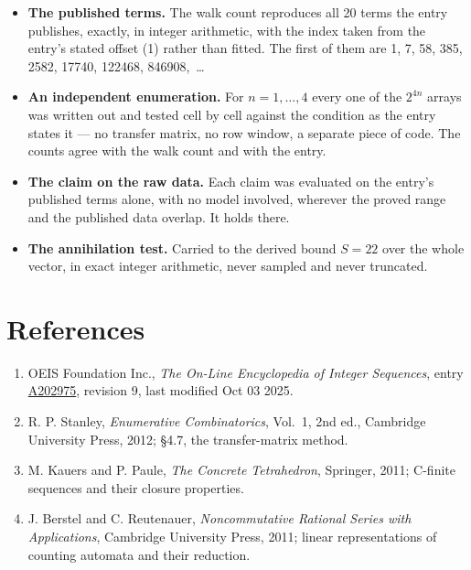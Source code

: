 \documentclass[11pt]{article}
\theoremstyle{definition}
\begin{document}
\begin{itemize}

\item {\bfseries The published terms.} The walk count reproduces all 20 terms the entry publishes, exactly, in integer arithmetic, with the index taken from the entry's stated offset (1) rather than fitted. The first of them are 1, 7, 58, 385, 2582, 17740, 122468, 846908,~\dots

\item {\bfseries An independent enumeration.} For $n = 1,\dots,4$ every one of the $2^{4n}$ arrays was written out and tested cell by cell against the condition as the entry states it --- no transfer matrix, no row window, a separate piece of code. The counts agree with the walk count and with the entry.

\item {\bfseries The claim on the raw data.} Each claim was evaluated on the entry's published terms alone, with no model involved, wherever the proved range and the published data overlap. It holds there.

\item {\bfseries The annihilation test.} Carried to the derived bound $S = 22$ over the whole vector, in exact integer arithmetic, never sampled and never truncated.

\end{itemize}

\section{References}

\begin{enumerate}

\item OEIS Foundation Inc., \emph{The On-Line Encyclopedia of Integer Sequences}, entry \href{https://oeis.org/A202975}{A202975}, revision 9, last modified Oct 03 2025.

\item R. P. Stanley, \emph{Enumerative Combinatorics}, Vol.~1, 2nd ed., Cambridge University Press, 2012; \S4.7, the transfer-matrix method.

\item M. Kauers and P. Paule, \emph{The Concrete Tetrahedron}, Springer, 2011; C-finite sequences and their closure properties.

\item J. Berstel and C. Reutenauer, \emph{Noncommutative Rational Series with Applications}, Cambridge University Press, 2011; linear representations of counting automata and their reduction.

\end{enumerate}
\end{document}

